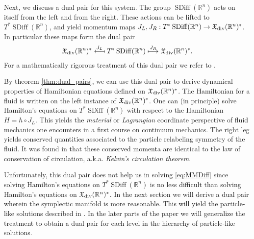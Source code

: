 \documentclass[12pt]{amsart}
\newcommand{\R}{\ensuremath{\mathbb{R}}}
\DeclareMathOperator{\SDiff}{SDiff}
\begin{document}
Next, we discuss a dual pair for this system.
The group $\SDiff(\R^n)$ acts on itself from the left and from the right.
These actions can be lifted to $T^* \SDiff(\R^n)$, and yield
momentum maps $J_L,J_R : T^*\SDiff(\R^n) \to \mathfrak{X}_{\rm div}(\R^n)^*$. In particular these maps form the dual pair
\begin{align*}
  \mathfrak{X}_{\rm div}(\R^n)^*
  \stackrel{J_L}{\longmapsfrom}
  T^* \SDiff(\R^n)
  \stackrel{J_R}{\longmapsto}
  \mathfrak{X}_{\rm div}(\R^n)^*.
\end{align*}
For a mathematically rigorous treatment of this dual pair we refer to \cite{GayBalmazVizman2012}.

By theorem \ref{thm:dual_pairs}, we can use this dual pair to derive dynamical properties of Hamiltonian equations defined on $\mathfrak{X}_{\rm div}(\R^n)^*$.
The Hamiltonian for a fluid is written on the left instance of $\mathfrak{X}_{\rm div}(\R^n)^*$.
One can (in principle) solve Hamilton's equations on $T^*\SDiff(\R^n)$
with respect to the Hamiltonian $H = h \circ J_L$.
This yields the \emph{material} or \emph{Lagrangian} coordinate perspective
of fluid mechanics one encounters in a first course on continuum
mechanics.
The right leg yields conserved quantities associated to the particle relabeling symmetry of the fluid.
It was found in \cite{Arnold1966} that these conserved momenta are identical
to the law of conservation of circulation, a.k.a. \emph{Kelvin's circulation theorem}.

Unfortunately, this dual pair does not help us in solving \eqref{eq:MMDiff}
since solving Hamilton's equations on $T^*\SDiff(\R^n)$ is no less difficult
than solving Hamilton's equations on $\mathfrak{X}_{\rm div}(\R^n)^*$.
In the next section we will derive a dual pair wherein the symplectic
manifold is more reasonable.
This will yield the particle-like solutions described in \cite{MumfordMichor2013}. In the later parts of the paper we will generalize the treatment to obtain a  dual pair for each level in the hierarchy of particle-like solutions.
\end{document}
